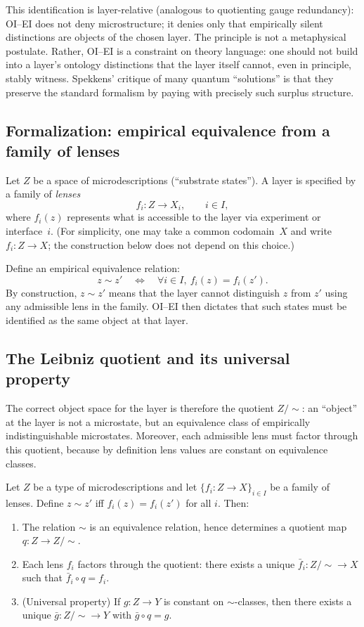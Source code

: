 This identification is layer-relative (analogous to quotienting gauge redundancy): OI--EI does not deny microstructure; it denies only that empirically silent distinctions are objects of the chosen layer.
The principle is not a metaphysical postulate. Rather, OI--EI is a constraint on theory language: one should not build into a layer's ontology distinctions that the layer itself cannot, even in principle, stably witness. Spekkens' critique of many quantum ``solutions'' is that they preserve the standard formalism by paying with precisely such surplus structure.

\subsection{Formalization: empirical equivalence from a family of lenses}

Let $Z$ be a space of microdescriptions (``substrate states''). A layer is specified by a family of \emph{lenses}
\[
 f_i : Z \to X_i,\qquad i\in I,
\]
where $f_i(z)$ represents what is accessible to the layer via experiment or interface~$i$.
(For simplicity, one may take a common codomain~$X$ and write $f_i : Z\to X$; the construction below does not depend on this choice.)

Define an empirical equivalence relation:
\[
 z \sim z' \quad\Longleftrightarrow\quad \forall i\in I,\ f_i(z)=f_i(z').
\]
By construction, $z\sim z'$ means that the layer cannot distinguish $z$ from $z'$ using any admissible lens in the family. OI--EI then dictates that such states must be identified as the same object at that layer.

\subsection{The Leibniz quotient and its universal property}

The correct object space for the layer is therefore the quotient $Z/{\sim}$: an ``object'' at the layer is not a microstate, but an equivalence class of empirically indistinguishable microstates.
Moreover, each admissible lens must factor through this quotient, because by definition lens values are constant on equivalence classes.

\begin{theorem}\label{thm:leibniz-quotient}
Let $Z$ be a type of microdescriptions and let $\{f_i : Z\to X\}_{i\in I}$ be a family of lenses. Define $z\sim z'$ iff $f_i(z)=f_i(z')$ for all $i$.
Then:
\begin{enumerate}
  \item The relation $\sim$ is an equivalence relation, hence determines a quotient map $q: Z\to Z/{\sim}$.
  \item Each lens $f_i$ factors through the quotient: there exists a unique $\bar f_i : Z/{\sim}\to X$ such that $\bar f_i\circ q = f_i$.
  \item (Universal property) If $g:Z\to Y$ is constant on $\sim$-classes, then there exists a unique $\bar g: Z/{\sim}\to Y$ with $\bar g\circ q = g$.
\end{enumerate}
\end{theorem}

